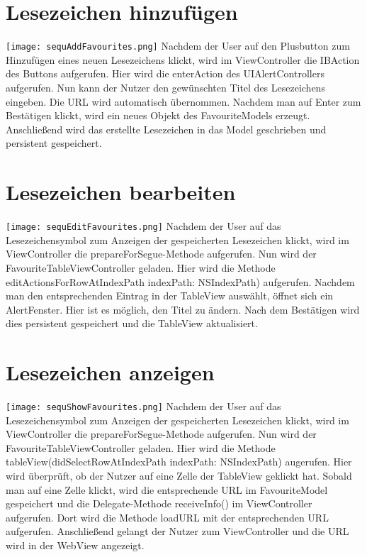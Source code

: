
\maketitle
\tableofcontents
\pagebreak

\section{Lesezeichen hinzufügen}
\texttt{[image: sequAddFavourites.png]}
Nachdem der User auf den Plusbutton zum Hinzufügen eines neuen Lesezeichens klickt, wird im ViewController die IBAction des Buttons aufgerufen. Hier wird die enterAction des UIAlertControllers aufgerufen. Nun kann der Nutzer den gewünschten Titel des Lesezeichens eingeben. Die URL wird automatisch übernommen. Nachdem man auf Enter zum Bestätigen klickt, wird ein neues Objekt des FavouriteModels erzeugt. Anschließend wird das erstellte Lesezeichen in das Model geschrieben und persistent gespeichert.
\pagebreak

\section{Lesezeichen bearbeiten}
\texttt{[image: sequEditFavourites.png]}
Nachdem der User auf das Lesezeichensymbol zum Anzeigen der gespeicherten Lesezeichen klickt, wird im ViewController die prepareForSegue-Methode aufgerufen. Nun wird der FavouriteTableViewController geladen. Hier wird die Methode editActionsForRowAtIndexPath indexPath: NSIndexPath) aufgerufen. Nachdem man den entsprechenden Eintrag in der TableView auswählt, öffnet sich ein AlertFenster. Hier ist es möglich, den Titel zu ändern. Nach dem Bestätigen wird dies persistent gespeichert und die TableView aktualisiert.
\pagebreak

\section{Lesezeichen anzeigen}
\texttt{[image: sequShowFavourites.png]}
Nachdem der User auf das Lesezeichensymbol zum Anzeigen der gespeicherten Lesezeichen klickt, wird im ViewController die prepareForSegue-Methode aufgerufen. Nun wird der FavouriteTableViewController geladen. Hier wird die Methode tableView(didSelectRowAtIndexPath indexPath: NSIndexPath) augerufen. Hier wird überprüft, ob der Nutzer auf eine Zelle der TableView geklickt hat. Sobald man auf eine Zelle klickt, wird die entsprechende URL im FavouriteModel gespeichert und die Delegate-Methode receiveInfo() im ViewController aufgerufen. Dort wird die Methode loadURL mit der entsprechenden URL aufgerufen. Anschließend gelangt der Nutzer zum ViewController und die URL wird in der WebView angezeigt.
\pagebreak

